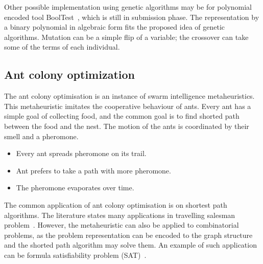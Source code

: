 \documentclass[
  print, %
  Table,   %
  nolof,     %
  nolot,     %
  11pt, %
  oneside  %
]{fithesis3}
\begin{document}
Other possible implementation using genetic algorithms may be for polynomial encoded tool BoolTest~\cite{sys2017detecting}, which is still in submission phase. The representation by a binary polynomial in algebraic form fits the proposed idea of genetic algorithms. Mutation can be a simple flip of a variable; the crossover can take some of the terms of each individual.



\subsection{Ant colony optimization}
\label{subsec:opt-popul-aco}

The ant colony optimisation is an instance of swarm intelligence metaheuristics. This metaheuristic imitates the cooperative behaviour of ants. Every ant has a simple goal of collecting food, and the common goal is to find shorted path between the food and the nest. The motion of the ants is coordinated by their smell and a pheromone.

\begin{itemize}
    \item Every ant spreads pheromone on its trail.
    \item Ant prefers to take a path with more pheromone.
    \item The pheromone evaporates over time.
\end{itemize}

The common application of ant colony optimisation is on shortest path algorithms. The literature states many applications in travelling salesman problem~\cite{dorigo1997ant, dorigo1997ant}. However, the metaheuristic can also be applied to combinatorial problems, as the problem representation can be encoded to the graph structure and the shorted path algorithm may solve them. An example of such application can be formula satisfiability problem (SAT)~\cite{moritz2010solving}.
\end{document}
